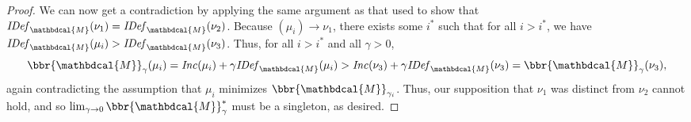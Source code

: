 \documentclass{article}
\theoremstyle{plain}
\theoremstyle{definition}
\theoremstyle{remark}
\newcommand{\dg}[1]{\mathbdcal{#1}}
\newcommand{\IDef}[1]{\mathit{IDef}_{#1}}
\newcommand\Inc{\mathit{Inc}}
\numberwithin{equation}{section}
\begin{document}
\begin{proof}
We can now get a contradiction by applying the same argument as that used to show
that $\IDef{\dg M}(\nu_1) =\IDef{\dg M}(\nu_2)$.  
    Because $(\mu_{i}) \to \nu_1$, there exists some
    $i^*$ such that for all $i > i^*$, we have $\IDef{\dg M}(\mu_{i}) >
    \IDef{\dg M}(\nu_3)$. Thus, for all $i > i^*$ and all
    $\gamma > 0$, 
    \[ \bbr{\dg M}_\gamma(\mu_{i}) = \Inc(\mu_{i}) + \gamma\IDef{\dg M}(\mu_{i}) > \Inc(\nu_3) 
    + \gamma \IDef{\dg M}(\nu_3) = \bbr{\dg M}_\gamma(\nu_3),\]
again contradicting the assumption that $\mu_{i}$ minimizes
$\bbr{\dg M}_{\gamma_{i}}$.
% 
%
Thus, our supposition that $\nu_1$ was distinct from $\nu_2$ cannot hold, and so
$\lim_{\gamma \to 0}\bbr{\dg M}_\gamma^*$ must be a singleton, as desired.
\end{proof}
\end{document}
